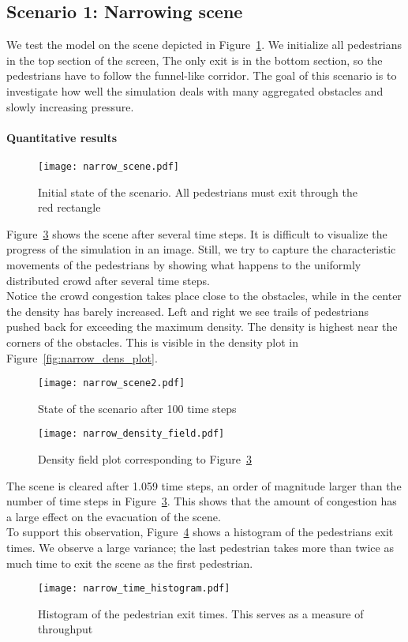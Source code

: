\documentclass{article}
\begin{document}
\subsection{Scenario 1: Narrowing scene}
We test the model on the scene depicted in Figure~\ref{fig:narrowing_scene}. We initialize all pedestrians in the top section of the screen, The only exit is in the bottom section, so the pedestrians have to follow the funnel-like corridor.
The goal of this scenario is to investigate how well the simulation deals with many aggregated obstacles and slowly increasing pressure.\\
\paragraph{Quantitative results}
\begin{figure}[h]
	\centering
	\texttt{[image: narrow\_scene.pdf]}
	\caption{Initial state of the scenario. All pedestrians must exit through the red rectangle}
	\label{fig:narrowing_scene}
\end{figure}
Figure~\ref{fig:narrow_scene2} shows the scene after several time steps. It is difficult to visualize the progress of the simulation in an image. Still, we try to capture the characteristic movements of the pedestrians by showing what happens to the uniformly distributed crowd after several time steps.\\
Notice the crowd congestion takes place close to the obstacles, while in the center the density has barely increased. Left and right we see trails of pedestrians pushed back for exceeding the maximum density. The density is highest near the corners of the obstacles. This is visible in the density plot in Figure~\ref{fig:narrow_dens_plot}.
\begin{figure}[h]
	\centering
	\texttt{[image: narrow\_scene2.pdf]}
	\caption{State of the scenario after 100 time steps}
	\label{fig:narrow_scene2}
\end{figure}

\begin{figure}[h]
    \centering
    \texttt{[image: narrow\_density\_field.pdf]}
	\caption{Density field plot corresponding to Figure~\ref{fig:narrow_scene2}}
    \label{fig:narrow_scene2}
\end{figure}
The scene is cleared after 1.059 time steps, an order of magnitude larger than the number of time steps in Figure~\ref{fig:narrow_scene2}. This shows that the amount of congestion has a large effect on the evacuation of the scene. \\
To support this observation, Figure~\ref{fig:narrow_time_histogram} shows a histogram of the pedestrians exit times. We observe a large variance; the last pedestrian takes more than twice as much time to exit the scene as the first pedestrian.
\begin{figure}[h]
    \centering
    \texttt{[image: narrow\_time\_histogram.pdf]}
    \caption{Histogram of the pedestrian exit times. This serves as a measure of throughput}
    \label{fig:narrow_time_histogram}
\end{figure}
\end{document}
